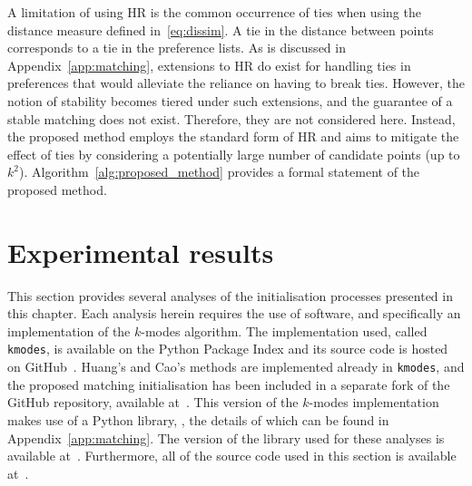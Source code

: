 \begin{table}[htbp]
    \caption{%
        Links between the initialisation and the components of a game
    }\label{tab:components}
\end{table}

A limitation of using HR is the common occurrence of ties when using the
distance measure defined in~\eqref{eq:dissim}. A tie in the distance between
points corresponds to a tie in the preference lists. As is discussed in
Appendix~\ref{app:matching}, extensions to HR do exist for handling ties in
preferences that would alleviate the reliance on having to break ties. However,
the notion of stability becomes tiered under such extensions, and the guarantee
of a stable matching does not exist. Therefore, they are not considered here.
Instead, the proposed method employs the standard form of HR and aims to
mitigate the effect of ties by considering a potentially large number of
candidate points (up to \(k^2\)). Algorithm~\ref{alg:proposed_method} provides a
formal statement of the proposed method.



\section{Experimental results}\label{sec:results}

This section provides several analyses of the initialisation processes presented
in this chapter. Each analysis herein requires the use of software, and
specifically an implementation of the \(k\)-modes algorithm. The implementation
used, called \texttt{kmodes}, is available on the Python Package
Index and its source code is hosted on GitHub~\cite{deVos2015}. Huang's and
Cao's methods are implemented already in \texttt{kmodes}, and the
proposed matching initialisation has been included in a separate fork of the
GitHub repository, available at~. This version of
the \(k\)-modes implementation makes use of a Python library, \matching, the
details of which can be found in Appendix~\ref{app:matching}. The version of the
library used for these analyses is available at~.
Furthermore, all of the source code used in this section is available
at~.

